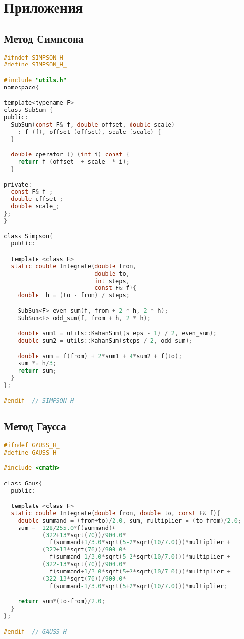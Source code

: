 \chapter*{Приложения}
\setcounter{section}{0}
\section{Метод Симпсона}
\begin{lstlisting}[language=C]
#ifndef SIMPSON_H_
#define SIMPSON_H_

#include "utils.h"
namespace{

template<typename F>
class SubSum {
public:
  SubSum(const F& f, double offset, double scale)
    : f_(f), offset_(offset), scale_(scale) {
  }

  double operator () (int i) const {
    return f_(offset_ + scale_ * i);
  }

private:
  const F& f_;
  double offset_;
  double scale_;
};
}

class Simpson{
  public:

  template <class F>
  static double Integrate(double from, 
                          double to, 
                          int steps, 
                          const F& f){
    double  h = (to - from) / steps;

    SubSum<F> even_sum(f, from + 2 * h, 2 * h);
    SubSum<F> odd_sum(f, from + h, 2 * h);

    double sum1 = utils::KahanSum((steps - 1) / 2, even_sum);
    double sum2 = utils::KahanSum(steps / 2, odd_sum);

    double sum = f(from) + 2*sum1 + 4*sum2 + f(to);
    sum *= h/3;
    return sum;
  }
};

#endif  // SIMPSON_H_

\end{lstlisting}
\newpage
\section{Метод Гаусса}
\begin{lstlisting}[language=C]
#ifndef GAUSS_H_
#define GAUSS_H_

#include <cmath>

class Gaus{
  public:

  template <class F>
  static double Integrate(double from, double to, const F& f){
    double summand = (from+to)/2.0, sum, multiplier = (to-from)/2.0;
    sum =  128/255.0*f(summand)+
           (322+13*sqrt(70))/900.0*
             f(summand+1/3.0*sqrt(5-2*sqrt(10/7.0)))*multiplier +
           (322+13*sqrt(70))/900.0*
             f(summand-1/3.0*sqrt(5-2*sqrt(10/7.0)))*multiplier +
           (322-13*sqrt(70))/900.0*
             f(summand+1/3.0*sqrt(5+2*sqrt(10/7.0)))*multiplier +
           (322-13*sqrt(70))/900.0*
             f(summand-1/3.0*sqrt(5+2*sqrt(10/7.0)))*multiplier;

    return sum*(to-from)/2.0;
  }
};

#endif  // GAUSS_H_
\end{lstlisting}
\newpage
